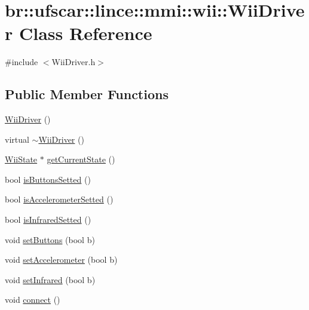\hypertarget{classbr_1_1ufscar_1_1lince_1_1mmi_1_1wii_1_1WiiDriver}{
\section{br::ufscar::lince::mmi::wii::WiiDriver Class Reference}
\label{classbr_1_1ufscar_1_1lince_1_1mmi_1_1wii_1_1WiiDriver}
}


{\ttfamily \#include $<$WiiDriver.h$>$}

\subsection*{Public Member Functions}
\begin{DoxyCompactItemize}
\item 
\hyperlink{classbr_1_1ufscar_1_1lince_1_1mmi_1_1wii_1_1WiiDriver_aab5fa49a7f90c20ea316a912c5b335fc}{WiiDriver} ()
\item 
virtual \hyperlink{classbr_1_1ufscar_1_1lince_1_1mmi_1_1wii_1_1WiiDriver_afec30a49896ecbfdef96b7043fa2a799}{$\sim$WiiDriver} ()
\item 
\hyperlink{classbr_1_1ufscar_1_1lince_1_1mmi_1_1wii_1_1WiiState}{WiiState} $\ast$ \hyperlink{classbr_1_1ufscar_1_1lince_1_1mmi_1_1wii_1_1WiiDriver_ad1fbb26cfd5009f792d7ad7f23b42523}{getCurrentState} ()
\item 
bool \hyperlink{classbr_1_1ufscar_1_1lince_1_1mmi_1_1wii_1_1WiiDriver_ad1fb0372f607385c3b20391eb005212d}{isButtonsSetted} ()
\item 
bool \hyperlink{classbr_1_1ufscar_1_1lince_1_1mmi_1_1wii_1_1WiiDriver_a8f54679e95645ad0284d77c51987ab98}{isAccelerometerSetted} ()
\item 
bool \hyperlink{classbr_1_1ufscar_1_1lince_1_1mmi_1_1wii_1_1WiiDriver_a419b13cbd01d04d9399287ce643c7b04}{isInfraredSetted} ()
\item 
void \hyperlink{classbr_1_1ufscar_1_1lince_1_1mmi_1_1wii_1_1WiiDriver_a24c5e0a9b6067419be8c08e8519b698f}{setButtons} (bool b)
\item 
void \hyperlink{classbr_1_1ufscar_1_1lince_1_1mmi_1_1wii_1_1WiiDriver_a98c084d2c015c259c252e72958afc986}{setAccelerometer} (bool b)
\item 
void \hyperlink{classbr_1_1ufscar_1_1lince_1_1mmi_1_1wii_1_1WiiDriver_a71196f296c892a1d8874da0d8eef9734}{setInfrared} (bool b)
\item 
void \hyperlink{classbr_1_1ufscar_1_1lince_1_1mmi_1_1wii_1_1WiiDriver_af383ae86791787d26b0bc3f817fb4146}{connect} ()
\end{DoxyCompactItemize}


